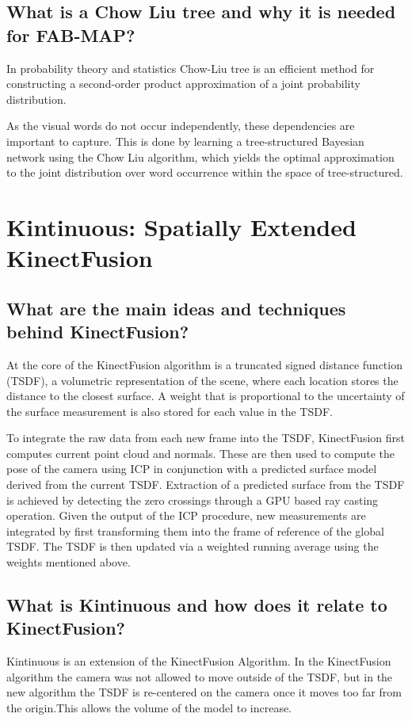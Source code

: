 \documentclass[paper=a4, fontsize=11pt]{scrartcl} %
\numberwithin{equation}{section} %
\numberwithin{figure}{section} %
\numberwithin{table}{section} %
\begin{document}
\subsection{What is a Chow Liu tree and why it is needed for FAB-MAP?}
In probability theory and statistics Chow-Liu tree is an efficient method for constructing a second-order product approximation of a joint probability distribution.

As the visual words do not occur independently, these dependencies are important to capture. This is done by learning a tree-structured Bayesian network using the Chow Liu algorithm, which yields the optimal approximation to the joint distribution over word occurrence within the space of tree-structured.


\section{Kintinuous: Spatially Extended KinectFusion}
\subsection{What are the main ideas and techniques behind KinectFusion?}
At the core of the KinectFusion algorithm is a truncated
signed distance function (TSDF), a volumetric representation
of the scene, where each location stores the distance to the
closest surface. A weight that is proportional to the uncertainty
of the surface measurement is also stored for each value in
the TSDF. 

To integrate the raw data from each new frame
into the TSDF, KinectFusion first computes current point cloud and normals. These are then used to compute the
pose of the camera using ICP in conjunction with a predicted
surface model derived from the current TSDF. Extraction of
a predicted surface from the TSDF is achieved by detecting
the zero crossings through a GPU based ray casting operation.
Given the output of the ICP procedure, new measurements
are integrated by first transforming them into the frame of
reference of the global TSDF. The TSDF is then updated via a
weighted running average using the weights mentioned above.
\subsection{What is Kintinuous and how does it relate to KinectFusion?}
Kintinuous is an extension of the KinectFusion Algorithm.
In the KinectFusion algorithm the camera was not allowed to move outside of the TSDF, but in the new algorithm the TSDF is re-centered on the camera once it moves too far from the origin.This allows the volume of the model to increase.
\end{document}
